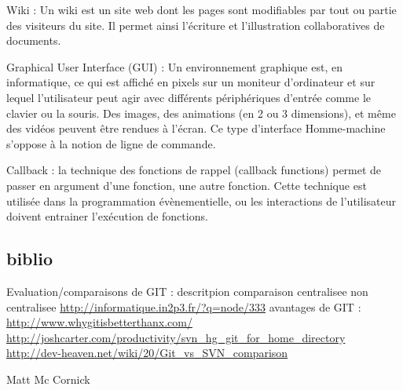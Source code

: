 Wiki : Un wiki est un site web dont les pages sont modifiables par tout ou partie des visiteurs du site. Il permet ainsi l'écriture et l'illustration collaboratives de documents.

Graphical User Interface (GUI) : Un environnement graphique est, en informatique, ce qui est affiché en pixels sur un moniteur
d'ordinateur et sur lequel l'utilisateur peut agir avec différents périphériques d'entrée comme le clavier ou la souris. 
Des images, des animations (en 2 ou 3 dimensions), et même des vidéos peuvent être rendues à l'écran.
Ce type d'interface Homme-machine s'oppose à la notion de ligne de commande.

Callback : la technique des fonctions de rappel (callback functions) permet de passer en argument d'une fonction, une autre fonction. 
Cette technique est utilisée dans la programmation évènementielle, ou les interactions de l'utilisateur doivent entrainer l'exécution de fonctions.

\subsection{biblio}

Evaluation/comparaisons de GIT :
descritpion comparaison centralisee non centralisee
\url{http://informatique.in2p3.fr/?q=node/333}
avantages de GIT :
\url{http://www.whygitisbetterthanx.com/}
\url{http://joshcarter.com/productivity/svn_hg_git_for_home_directory}
\url{http://dev-heaven.net/wiki/20/Git_vs_SVN_comparison}

Matt Mc Cornick

